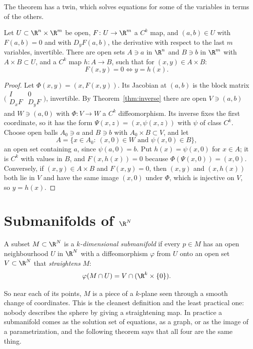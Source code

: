 The theorem has a twin, which solves equations for some of the variables in terms of the others.

\begin{theorem}\label{thm:implicit}
Let $U\subset\R^n\times\R^m$ be open, $F\colon U\to\R^m$ a $C^k$ map, and $(a,b)\in U$ with $F(a,b)=0$ and with $D_yF(a,b)$, the derivative with respect
to the last $m$ variables, invertible. There are open sets $A\ni a$ in $\R^n$ and $B\ni b$ in $\R^m$ with $A\times B\subset U$, and a $C^k$ map
$h\colon A\to B$, such that for $(x,y)\in A\times B$:
\[
F(x,y)=0\iff y=h(x).
\]
\end{theorem}
\begin{proof}
Let $\Phi(x,y)=(x,F(x,y))$. Its Jacobian at $(a,b)$ is the block matrix $\bigl(\begin{smallmatrix}I&0\\ D_xF&D_yF\end{smallmatrix}\bigr)$, invertible.
By Theorem~\ref{thm:inverse} there are open $V\ni(a,b)$ and $W\ni(a,0)$ with $\Phi\colon V\to W$ a $C^k$ diffeomorphism. Its inverse fixes the first
coordinate, so it has the form $\Psi(x,z)=(x,\psi(x,z))$ with $\psi$ of class $C^k$. Choose open balls $A_0\ni a$ and $B\ni b$ with $A_0\times B\subset V$,
and let
\[
A=\{x\in A_0:\ (x,0)\in W\text{ and }\psi(x,0)\in B\},
\]
an open set containing $a$, since $\psi(a,0)=b$. Put $h(x)=\psi(x,0)$ for $x\in A$; it is $C^k$ with values in $B$, and $F(x,h(x))=0$ because
$\Phi(\Psi(x,0))=(x,0)$. Conversely, if $(x,y)\in A\times B$ and $F(x,y)=0$, then $(x,y)$ and $(x,h(x))$ both lie in $V$ and have the same image $(x,0)$
under $\Phi$, which is injective on $V$, so $y=h(x)$.
\end{proof}

\section{Submanifolds of \texorpdfstring{$\R^N$}{R\^{}N}}\label{sec:submanifolds}

\begin{definition}
A subset $M\subset\R^N$ is a \emph{$k$-dimensional submanifold} if every $p\in M$ has an open neighbourhood $U$ in $\R^N$ with a diffeomorphism $\varphi$
from $U$ onto an open set $V\subset\R^N$ that \emph{straightens} $M$:
\[
\varphi(M\cap U)=V\cap(\R^k\times\{0\}).
\]
\end{definition}

So near each of its points, $M$ is a piece of a $k$-plane seen through a smooth change of coordinates. This is the cleanest definition and the least
practical one: nobody describes the sphere by giving a straightening map. In practice a submanifold comes as the solution set of equations, as a graph,
or as the image of a parametrization, and the following theorem says that all four are the same thing.

